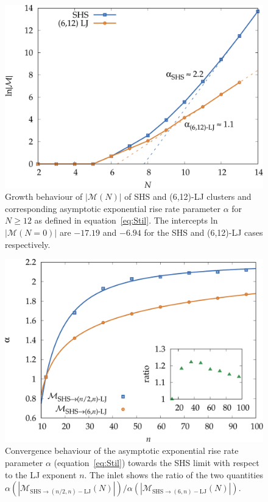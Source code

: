 \begin{figure}
    \centering
    \includegraphics[width=0.8\columnwidth]{kslj/growth.pdf}
    \caption{Growth behaviour of $|\mathcal{M}(N)|$ of \acs{SHS} and (6,12)-LJ
    clusters and corresponding asymptotic exponential rise rate parameter
    $\alpha$ for $N \geq 12$ as defined in equation~\eqref{eq:Stil}.  The intercepts
    ln$|\mathcal{M}(N=0)|$ are $-17.19$ and $-6.94$ for the \acs{SHS} and
    (6,12)-LJ cases respectively.}
    \label{fig:asympt}
\end{figure}

\begin{figure}
    \centering
    \includegraphics[width=0.8\columnwidth]{kslj/repulsive13-14.pdf}
    \caption{Convergence behaviour of the asymptotic exponential rise rate
    parameter $\alpha$ (equation~\eqref{eq:Stil}) towards the \acs{SHS} limit with
    respect to the \acs{LJ} exponent $n$. The inlet shows the ratio of the two
    quantities $\alpha(|\mathcal{M}_{\text{SHS}\to (n/2,n)-\text{LJ}}(N)|)
    / \alpha(|\mathcal{M}_{\text{SHS}\to (6,n)-\text{LJ}}(N)|)$.}
    \label{fig:repulsive13-14}
\end{figure}


